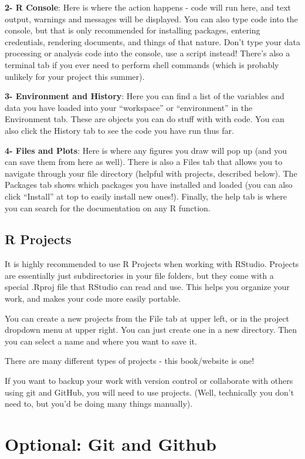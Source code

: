 \documentclass[
  letterpaper,
  DIV=11,
  numbers=noendperiod]{scrreprt}
\begin{document}
\textbf{2- R Console}: Here is where the action happens - code will run
here, and text output, warnings and messages will be displayed. You can
also type code into the console, but that is only recommended for
installing packages, entering credentials, rendering documents, and
things of that nature. Don't type your data processing or analysis code
into the console, use a script instead! There's also a terminal tab if
you ever need to perform shell commands (which is probably unlikely for
your project this summer).

\textbf{3- Environment and History}: Here you can find a list of the
variables and data you have loaded into your ``workspace'' or
``environment'' in the Environment tab. These are objects you can do
stuff with with code. You can also click the History tab to see the code
you have run thus far.

\textbf{4- Files and Plots}: Here is where any figures you draw will pop
up (and you can save them from here as well). There is also a Files tab
that allows you to navigate through your file directory (helpful with
projects, described below). The Packages tab shows which packages you
have installed and loaded (you can also click ``Install'' at top to
easily install new ones!). Finally, the help tab is where you can search
for the documentation on any R function.

\section{R Projects}\label{sec-rprojects}

It is highly recommended to use R Projects when working with RStudio.
Projects are essentially just subdirectories in your file folders, but
they come with a special .Rproj file that RStudio can read and use. This
helps you organize your work, and makes your code more easily portable.

You can create a new projects from the File tab at upper left, or in the
project dropdown menu at upper right. You can just create one in a new
directory. Then you can select a name and where you want to save it.

There are many different types of projects - this book/website is one!

If you want to backup your work with version control or collaborate with
others using git and GitHub, you will need to use projects. (Well,
technically you don't need to, but you'd be doing many things manually).

\chapter{Optional: Git and Github}\label{optional-git-and-github}
\end{document}
